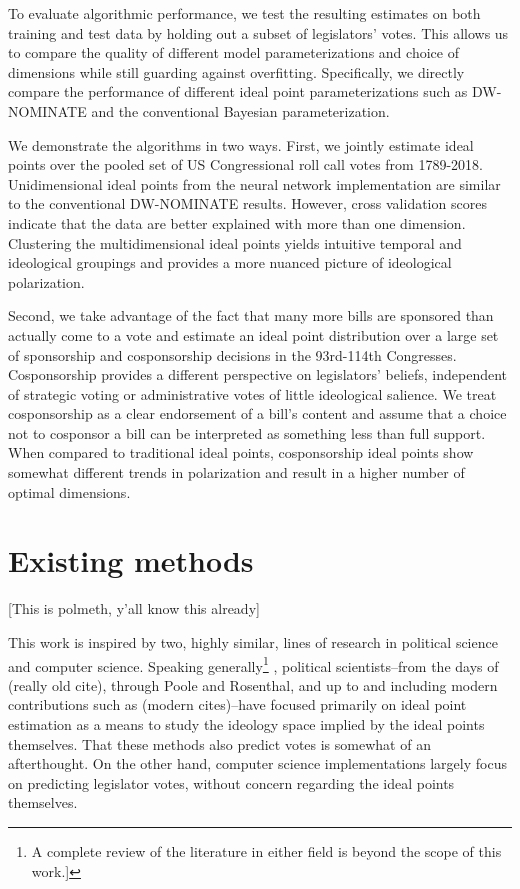 \documentclass[11pt,]{article}
\begin{document}
To evaluate algorithmic performance, we test the resulting estimates on
both training and test data by holding out a subset of legislators'
votes. This allows us to compare the quality of different model
parameterizations and choice of dimensions while still guarding against
overfitting. Specifically, we directly compare the performance of
different ideal point parameterizations such as DW-NOMINATE and the
conventional Bayesian parameterization.

We demonstrate the algorithms in two ways. First, we jointly estimate
ideal points over the pooled set of US Congressional roll call votes
from 1789-2018. Unidimensional ideal points from the neural network
implementation are similar to the conventional DW-NOMINATE results.
However, cross validation scores indicate that the data are better
explained with more than one dimension. Clustering the multidimensional
ideal points yields intuitive temporal and ideological groupings and
provides a more nuanced picture of ideological polarization.

Second, we take advantage of the fact that many more bills are sponsored
than actually come to a vote and estimate an ideal point distribution
over a large set of sponsorship and cosponsorship decisions in the
93rd-114th Congresses. Cosponsorship provides a different perspective on
legislators' beliefs, independent of strategic voting or administrative
votes of little ideological salience. We treat cosponsorship as a clear
endorsement of a bill's content and assume that a choice not to
cosponsor a bill can be interpreted as something less than full support.
When compared to traditional ideal points, cosponsorship ideal points
show somewhat different trends in polarization and result in a higher
number of optimal dimensions.

\section{Existing methods}\label{existing-methods}

{[}This is polmeth, y'all know this already{]}

This work is inspired by two, highly similar, lines of research in
political science and computer science. Speaking generally\footnote{A
  complete review of the literature in either field is beyond the scope
  of this work.{]}} , political scientists--from the days of (really old
cite), through Poole and Rosenthal, and up to and including modern
contributions such as (modern cites)--have focused primarily on ideal
point estimation as a means to study the ideology space implied by the
ideal points themselves. That these methods also predict votes is
somewhat of an afterthought. On the other hand, computer science
implementations largely focus on predicting legislator votes, without
concern regarding the ideal points themselves.
\end{document}
